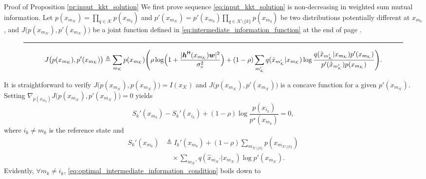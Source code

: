 \documentclass[journal]{IEEEtran}
\begin{document}
\begin{appendix}
	\begin{subsection}{Proof of Proposition \ref{pr:input_kkt_solution}}
		We first prove sequence \eqref{eq:input_kkt_solution} is non-decreasing in weighted sum mutual information.
		Let $p(x_{m_{\mathcal{K}}}) = \prod_{q \in \mathcal{K}} p(x_{m_q})$ and $p'(x_{m_{\mathcal{K}}}) = p'(x_{m_k}) \prod_{q \in \mathcal{K} \setminus \{k\}} p(x_{m_q})$ be two distributions potentially different at $x_{m_k}$,
		and $J \bigl(p(x_{m_{\mathcal{K}}}),p'(x_{m_{\mathcal{K}}}) \bigr)$ be a joint function defined in \eqref{eq:intermediate_information_function} at the end of page \pageref{eq:intermediate_information_function}.
		\begin{figure*}[!b]
			\hrule
			\begin{equation}
				J \bigl( p(x_{m_{\mathcal{K}}}),p'(x_{m_{\mathcal{K}}}) \bigr) \triangleq \sum_{m_{\mathcal{K}}} p(x_{m_{\mathcal{K}}})
				\Biggl( \rho \log \Bigl(1 + \frac{\lvert \boldsymbol{h}^\mathsf{H}(x_{m_{\mathcal{K}}}) \boldsymbol{w} \rvert^2}{\sigma_v^2}\Bigr) + (1 - \rho) \sum_{m_{\mathcal{K}}'} q(\hat{x}_{m_{\mathcal{K}}'}|x_{m_{\mathcal{K}}}) \log \frac{q(\hat{x}_{m_{\mathcal{K}}'}|x_{m_{\mathcal{K}}}) p'(x_{m_{\mathcal{K}}})}{p'(\hat{x}_{m_{\mathcal{K}}'}) p(x_{m_{\mathcal{K}}})} \Biggr).
				\label{eq:intermediate_information_function}
			\end{equation}
		\end{figure*}
		It is straightforward to verify $J \bigl( p(x_{m_{\mathcal{K}}}),p(x_{m_{\mathcal{K}}}) \bigr) = I(x_{\mathcal{K}})$ and $J \bigl( p(x_{m_{\mathcal{K}}}),p'(x_{m_{\mathcal{K}}}) \bigr)$ is a concave function for a given $p'(x_{m_{\mathcal{K}}})$.
		Setting $\nabla_{p(x_{m_k})} J \bigl( p(x_{m_{\mathcal{K}}}),p'(x_{m_{\mathcal{K}}}) \bigr) = 0$ yields
		\begin{equation}
			S_k'(x_{m_k}) - S_k'(x_{i_k}) + (1 - \rho) \log \frac{p(x_{i_k})}{p^\star(x_{m_k})} = 0,
			\label{eq:optimal_intermediate_information_condition}
		\end{equation}
		where $i_k \ne m_k$ is the reference state and
		\begin{align}
			S_k'(x_{m_k})
			 & \triangleq I_k'(x_{m_k}) + (1 - \rho) \sum_{m_{\mathcal{K} \setminus \{k\}}} p(x_{m_{\mathcal{K} \setminus \{k\}}})\nonumber \\
			 & \quad \times \sum_{m_{\mathcal{K}}'} q(\hat{x}_{m_{\mathcal{K}}'}|x_{m_{\mathcal{K}}}) \log p'(x_{m_{\mathcal{K}}}).
		\end{align}
		Evidently, $\forall m_k \ne i_k$, \eqref{eq:optimal_intermediate_information_condition} boils down to

\end{subsection}
\end{appendix}
\end{document}
